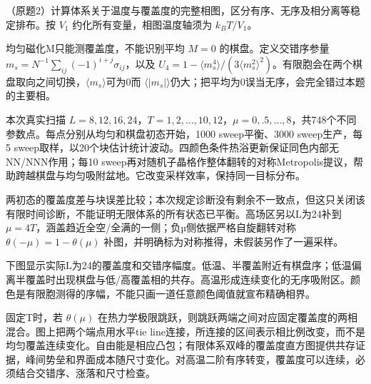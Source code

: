 \begin{exercise}\label{task:lab5-2}
（原题2）计算体系关于温度与覆盖度的完整相图，区分有序、无序及相分离等稳定排布。按 $V_1$ 约化所有变量，相图温度轴须为 $k_BT/V_1$。
\end{exercise}
\begin{solution}
均匀磁化M只能测覆盖度，不能识别平均 $M=0$ 的棋盘。定义交错序参量 $m_s=N^{-1}\sum_{ij}(-1)^{i+j}\sigma_{ij}$，以及 $U_4=1-\langle m_s^4\rangle/(3\langle m_s^2\rangle^2)$。有限胞会在两个棋盘取向之间切换，$\langle m_s\rangle$可为0而 $\langle|m_s|\rangle$仍大；把平均为0误当无序，会完全错过本题的主要相。

本次真实扫描 $L=8,12,16,24$，$T=1,2,\ldots,10,12$，$\mu=0,.5,\ldots,8$，共748个不同参数点。每点分别从均匀和棋盘初态开始，1000 sweep平衡、3000 sweep生产，每5 sweep取样，以20个块估计统计波动。四颜色条件热浴更新保证同色内部无NN/NNN作用；每10 sweep再对随机子晶格作整体翻转的对称Metropolis提议，帮助跨越棋盘与均匀吸附盆地。它改变采样效率，保持同一目标分布。

两初态的覆盖度差与块误差比较；本次规定诊断没有剩余不一致点，但这只关闭该有限时间诊断，不能证明无限体系的所有状态已平衡。高场区另以L为24补到 $\mu=4T$，涵盖趋近全空/全满的一侧；负µ侧依据严格自旋翻转对称 $\theta(-\mu)=1-\theta(\mu)$ 补图，并明确标为对称推得，未假装另作了一遍采样。

下图显示实际L为24的覆盖度和交错序幅度。低温、半覆盖附近有棋盘序；低温偏离半覆盖时出现棋盘与低/高覆盖相的共存。高温形成连续变化的无序吸附区。颜色是有限胞测得的序幅，不能只画一道任意颜色阈值就宣布精确相界。
\begin{center}\end{center}

固定T时，若 $\theta(\mu)$ 在热力学极限跳跃，则跳跃两端之间对应固定覆盖度的两相混合。图上把两个端点用水平tie line连接，所连接的区间表示相比例改变，而不是均匀覆盖连续变化。自由能是相应凸包；有限体系双峰的覆盖度直方图提供共存证据，峰间势垒和界面成本随尺寸变化。对高温二阶有序转变，覆盖度可以连续，必须结合交错序、涨落和尺寸检查。


\end{solution}
